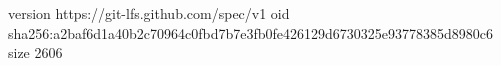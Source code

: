 version https://git-lfs.github.com/spec/v1
oid sha256:a2baf6d1a40b2c70964c0fbd7b7e3fb0fe426129d6730325e93778385d8980c6
size 2606
